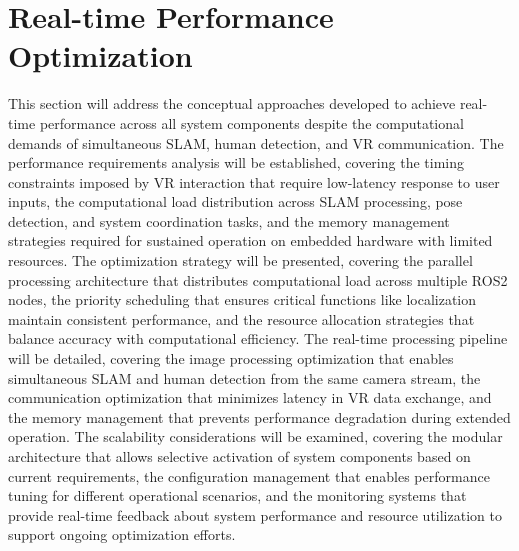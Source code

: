 \section{Real-time Performance Optimization}
This section will address the conceptual approaches developed to achieve real-time performance across all system components despite the computational demands of simultaneous SLAM, human detection, and VR communication. The performance requirements analysis will be established, covering the timing constraints imposed by VR interaction that require low-latency response to user inputs, the computational load distribution across SLAM processing, pose detection, and system coordination tasks, and the memory management strategies required for sustained operation on embedded hardware with limited resources. The optimization strategy will be presented, covering the parallel processing architecture that distributes computational load across multiple ROS2 nodes, the priority scheduling that ensures critical functions like localization maintain consistent performance, and the resource allocation strategies that balance accuracy with computational efficiency. The real-time processing pipeline will be detailed, covering the image processing optimization that enables simultaneous SLAM and human detection from the same camera stream, the communication optimization that minimizes latency in VR data exchange, and the memory management that prevents performance degradation during extended operation. The scalability considerations will be examined, covering the modular architecture that allows selective activation of system components based on current requirements, the configuration management that enables performance tuning for different operational scenarios, and the monitoring systems that provide real-time feedback about system performance and resource utilization to support ongoing optimization efforts.
